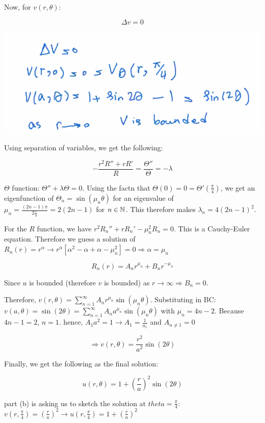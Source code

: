 \documentclass{article}
\begin{document}
Now, for $v(r, \theta)$:

$$\Delta v = 0$$

\begin{center}
    \includegraphics[width = 0.7 \textwidth]{2.png}
\end{center}

Using separation of variables, we get the following:

$$- \frac{r^2 R'' + r R'}{R} = \frac{\Theta''}{\Theta} = - \lambda$$

$\Theta$ function: $\Theta'' + \lambda \Theta = 0$. Using the factn that $\Theta(0) = 0 = \Theta'(\frac{\pi}{4})$, we get an eigenfunction of $\Theta_n = \sin( \mu_n \theta)$ for an eigenvalue of $\mu_n = \frac{(2n-1) \pi}{2 \frac{\pi}{4}} = 2(2n-1)$ for $n \in \mathbb{N}$. This therefore makes $\lambda_n = 4 (2n-1)^2$. 

For the $R$ function, we have $r^2 R_n'' + r R_n' - \mu_n^2 R_n = 0$. This is a Cauchy-Euler equation. Therefore we guess a solution of $R_n(r) = r^{\alpha} \longrightarrow r^\alpha \left[ \alpha^2 - \alpha + \alpha - \mu_n^2 \right] = 0 \Rightarrow \alpha = \mu_n$

$$R_n(r) = A_n r^{\mu_n} + B_n r^{-\mu_n}$$

Since $u$ is bounded (therefore $v$ is bounded) as $ r \to \infty \Rightarrow B_n = 0$. 

Therefore, $v(r, \theta) = \sum_{n=1}^\infty A_n r^{\mu_n} \sin(\mu_n \theta)$. Substituting in BC: $v(a, \theta) = \sin (2 \theta) = \sum_{n=1}^\infty A_n a^{\mu_n} \sin(\mu_n \theta)$ with $\mu_n = 4n-2$. Because $4n-1 = 2$, $n = 1$. hence, $A_1 a^2 = 1 \rightarrow A_1 = \frac{1}{a_1}$ and $A_{n \neq 1} = 0$

$$\Rightarrow v(r, \theta) = \frac{r^2}{a^2} \sin(2 \theta)$$

Finally, we get the following as the final solution:

$$u(r, \theta) = 1 + \left( \frac{r}{a} \right)^2 \sin(2 \theta)$$

part (b) is asking us to sketch the solution at $theta = \frac{\pi}{4}$: $v(r, \frac{\pi}{4}) = \left( \frac{r}{a} \right)^2 \rightarrow u(r, 
\frac{\pi}{4}) = 1 + \left( \frac{r}{a} \right)^2$
\end{document}
